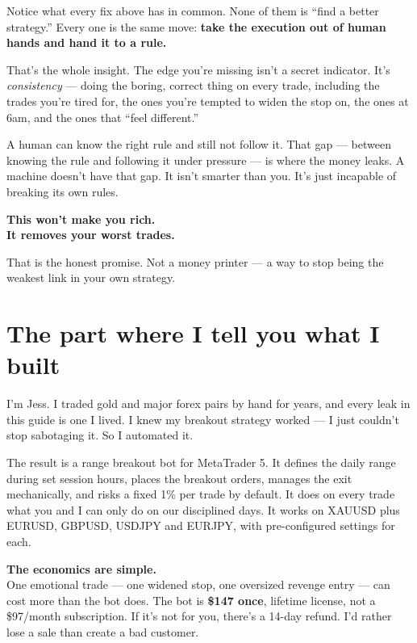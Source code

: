 \documentclass[11pt]{article}
\begin{document}
Notice what every fix above has in common. None of them is ``find a better strategy.'' Every one is the same move: \textbf{take the execution out of human hands and hand it to a rule.}

That's the whole insight. The edge you're missing isn't a secret indicator. It's \emph{consistency} --- doing the boring, correct thing on every trade, including the trades you're tired for, the ones you're tempted to widen the stop on, the ones at 6am, and the ones that ``feel different.''

A human can know the right rule and still not follow it. That gap --- between knowing the rule and following it under pressure --- is where the money leaks. A machine doesn't have that gap. It isn't smarter than you. It's just incapable of breaking its own rules.

\begin{center}
{\color{ink}\Large\bfseries This won't make you rich.\\[2pt] {\color{neon}It removes your worst trades.}}
\end{center}

That is the honest promise. Not a money printer --- a way to stop being the weakest link in your own strategy.

\newpage

\section{The part where I tell you what I built}

I'm Jess. I traded gold and major forex pairs by hand for years, and every leak in this guide is one I lived. I knew my breakout strategy worked --- I just couldn't stop sabotaging it. So I automated it.

The result is a range breakout bot for MetaTrader 5. It defines the daily range during set session hours, places the breakout orders, manages the exit mechanically, and risks a fixed 1\% per trade by default. It does on every trade what you and I can only do on our disciplined days. It works on XAUUSD plus EURUSD, GBPUSD, USDJPY and EURJPY, with pre-configured settings for each.

\begin{fixbox}
\textbf{\color{ink}The economics are simple.}\\[0.6ex]
One emotional trade --- one widened stop, one oversized revenge entry --- can cost more than the bot does. The bot is \textbf{\$147 once}, lifetime license, not a \$97/month subscription. If it's not for you, there's a 14-day refund. I'd rather lose a sale than create a bad customer.
\end{fixbox}
\end{document}
